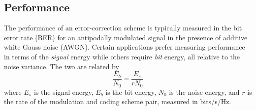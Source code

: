 \subsection{Performance}
\label{module:fec:performance}
The performance of an error-correction scheme is typically measured in
the bit error rate (BER) for an antipodally modulated signal in the
presence of additive white Gauss noise (AWGN).
Certain applications prefer measuring performance in terms of the
{\em signal} energy while others require {\em bit} energy,
all relative to the noise variance.
The two are related by
%
\begin{equation}
\label{eqn:fec:esn0_ebn0}
    \frac{E_b}{N_0} = \frac{E_s}{r N_0}
\end{equation}
%
where
$E_s$ is the signal energy,
$E_b$ is the bit energy,
$N_0$ is the noise energy,
and
$r$ is the rate of the modulation and coding scheme pair,
measured in bits/s/Hz.
%
